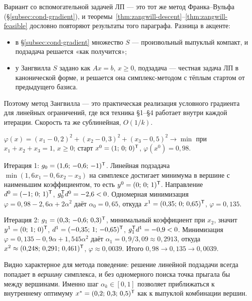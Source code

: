 \begin{idea}[title={Чем это отличается от метода условного градиента}]
Вариант со вспомогательной задачей ЛП — это тот же метод Франка--Вульфа
(\S\ref{subsec:cond-gradient}), и теоремы~\ref{thm:zangwill-descent}--\ref{thm:zangwill-feasible}
дословно повторяют результаты того параграфа. Разница в акценте:
\begin{itemize}[nosep,left=0pt]
  \item в \S\ref{subsec:cond-gradient} множество $S$ — произвольный выпуклый
        компакт, и подзадача решается «как получится»;
  \item у Зангвилла $S$ задано как $Ax = b$, $x \ge 0$, подзадача — честная
        задача ЛП в канонической форме, и решается она симплекс-методом с
        тёплым стартом от предыдущего базиса.
\end{itemize}
Поэтому метод Зангвилла — это практическая реализация условного градиента для
линейных ограничений, где вся техника §1--§4 работает внутри каждой итерации.
Скорость та же сублинейная, $O(1/k)$.
\end{idea}

\begin{example}
$\varphi(x) = (x_1-0{,}2)^2 + (x_2-0{,}3)^2 + (x_3-0{,}5)^2 \to \min$ при
$x_1+x_2+x_3 = 1$, $x \ge 0$; старт $x^0 = (1;\,0;\,0)^{\mathsf{T}}$,
$\varphi(x^0) = 0{,}98$.

Итерация 1: $g_0 = (1{,}6;\,-0{,}6;\,-1)^{\mathsf{T}}$. Линейная подзадача
$\min(1{,}6x_1 - 0{,}6x_2 - x_3)$ на симплексе достигает минимума в вершине с
наименьшим коэффициентом, то есть $y^0 = (0;\,0;\,1)^{\mathsf{T}}$. Направление
$d^0 = (-1;\,0;\,1)^{\mathsf{T}}$, $g_0^{\mathsf{T}} d^0 = -2{,}6 < 0$. Одномерная минимизация
$\varphi = 0{,}98 - 2{,}6\alpha + 2\alpha^2$ даёт $\alpha_0 = 0{,}65$, откуда
$x^1 = (0{,}35;\,0;\,0{,}65)^{\mathsf{T}}$, $\varphi = 0{,}135$.

Итерация 2: $g_1 = (0{,}3;\,-0{,}6;\,0{,}3)^{\mathsf{T}}$, минимальный коэффициент при
$x_2$, значит $y^1 = (0;\,1;\,0)^{\mathsf{T}}$, $d^1 = (-0{,}35;\,1;\,-0{,}65)^{\mathsf{T}}$,
$g_1^{\mathsf{T}} d^1 = -0{,}9 < 0$. Минимизация
$\varphi = 0{,}135 - 0{,}9\alpha + 1{,}545\alpha^2$ даёт
$\alpha_1 = 0{,}9/3{,}09 \approx 0{,}2913$, откуда
$x^2 \approx (0{,}248;\,0{,}291;\,0{,}461)^{\mathsf{T}}$, $\varphi \approx 0{,}0039$.
Итого $0{,}98 \to 0{,}135 \to 0{,}0039$.
\end{example}

\begin{idea}
Видно характерное для метода поведение: решение линейной подзадачи всегда
попадает в \emph{вершину} симплекса, и без одномерного поиска точка прыгала бы
между вершинами. Именно шаг $\alpha_k \in [0,1]$ позволяет приближаться к
внутреннему оптимуму $x^* = (0{,}2;\,0{,}3;\,0{,}5)^{\mathsf{T}}$ как к выпуклой
комбинации вершин.
\end{idea}
